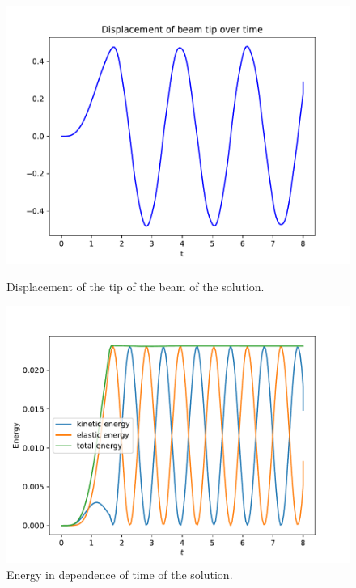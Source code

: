 \documentclass{report}
\begin{document}
\begin{figure}[h]
\begin{minipage}[t]{0.45\textwidth}
\centering
\includegraphics[width=\textwidth]{../Plots/Project3_main/Figure_905.pdf}
\caption{Displacement of the tip of the beam of the solution.}
\label{pl:beam_soln_displacement}
\end{minipage}
\hfill
\centering
\begin{minipage}[t]{0.45\textwidth}
\centering
\includegraphics[width=\textwidth]{../Plots/Project3_main/Figure_902.pdf}
\caption{Energy in dependence of time of the solution.}
\label{pl:beam_soln_energy}
\end{minipage}
\end{figure}
\end{document}

